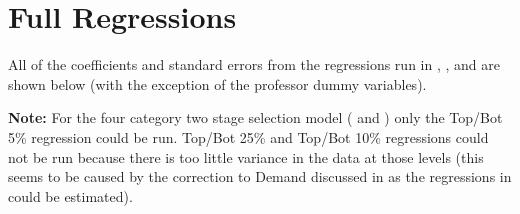 \section{Full Regressions}\label{appendix:b}

All of the coefficients and standard errors from the regressions run in , , and  are shown below (with the exception of the professor dummy variables).

\bigskip
\noindent \textbf{Note:} For the four category two stage selection model ( and ) only the Top/Bot 5\% regression could be run. Top/Bot 25\% and Top/Bot 10\% regressions could not be run because there is too little variance in the data at those levels (this seems to be caused by the correction to Demand discussed in  as the regressions in  could be estimated).

\clearpage{}


